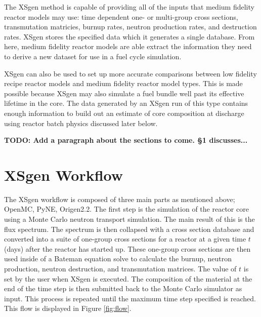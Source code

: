 \documentclass{article}
\newcommand{\TODO}[1] {{\color{red}\textbf{TODO: #1}}}
\begin{document}
The XSgen method is capable of providing all of the inputs that medium fidelity reactor models
may use: time dependent one- or multi-group cross sections, transmutation matricies,
burnup rates, neutron production rates, and destruction rates.
XSgen stores the specified data which it generates a single database.
From here, medium fidelity reactor models are able extract the information they need to
derive a new dataset for use in a fuel cycle simulation.

XSgen can also be used to set up more accurate comparisons between low fidelity recipe reactor
models and medium fidelity reactor model types. This is made possible because XSgen may also
simulate a fuel bundle well past its effective lifetime in the core. The data generated by an
XSgen run of this type contains enough information to build out an estimate of core composition
at discharge using reactor batch physics discussed later below.

\TODO{Add a paragraph about the sections to come. \S 1 discusses...}

\section{XSgen Workflow}
The XSgen workflow is composed of three main parts as mentioned above; OpenMC, PyNE, Origen2.2. The first step is the simulation of the reactor core using a Monte Carlo neutron transport simulation. The main result of this is the flux spectrum. The spectrum is then collapsed with a cross section database and converted into a suite of one-group cross sections for a reactor at a given time $t$ (days) after the reactor has started up. These one-group cross sections are then used inside of
a Bateman equation solve to calculate the burnup, neutron production, neutron destruction,
and transmutation matrices. The value of $t$ is set by the user when XSgen is executed.
The composition of the material at the end of the time step is then submitted back to
the Monte Carlo simulator as input. This process is repeated until the maximum time
step specified is reached. This flow is displayed in Figure \ref{fig:flow}.
\end{document}
